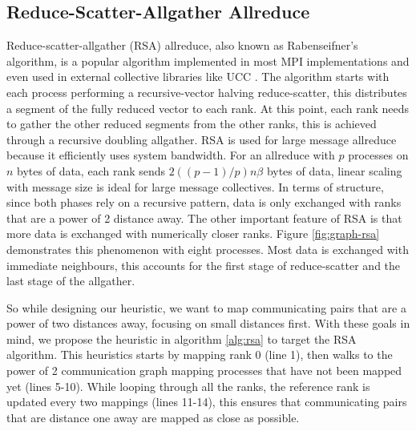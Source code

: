 \subsection{Reduce-Scatter-Allgather Allreduce}
Reduce-scatter-allgather (RSA) allreduce, also known as Rabenseifner's algorithm, is a popular algorithm implemented in most MPI implementations and even used in external collective libraries like UCC \cite{UCC}.
The algorithm starts with each process performing a recursive-vector halving reduce-scatter, this distributes a segment of the fully reduced vector to each rank.
At this point, each rank needs to gather the other reduced segments from the other ranks, this is achieved through a recursive doubling allgather.
RSA is used for large message allreduce because it efficiently uses system bandwidth.
For an allreduce with $p$ processes on $n$ bytes of data, each rank sends $2((p-1)/p)n\beta$ bytes of data, linear scaling with message size is ideal for large message collectives.
In terms of structure, since both phases rely on a recursive pattern, data is only exchanged with ranks that are a power of 2 distance away.
The other important feature of RSA is that more data is exchanged with numerically closer ranks.
Figure \ref{fig:graph-rsa} demonstrates this phenomenon with eight processes.
Most data is exchanged with immediate neighbours, this accounts for the first stage of reduce-scatter and the last stage of the allgather.

So while designing our heuristic, we want to map communicating pairs that are a power of two distances away, focusing on small distances first.
With these goals in mind, we propose the heuristic in algorithm \ref{alg:rsa} to target the RSA algorithm.
This heuristics starts by mapping rank 0 (line 1), then walks to the power of 2 communication graph mapping processes that have not been mapped yet (lines 5-10). 
While looping through all the ranks, the reference rank is updated every two mappings (lines 11-14), this ensures that communicating pairs that are distance one away are mapped as close as possible. 




